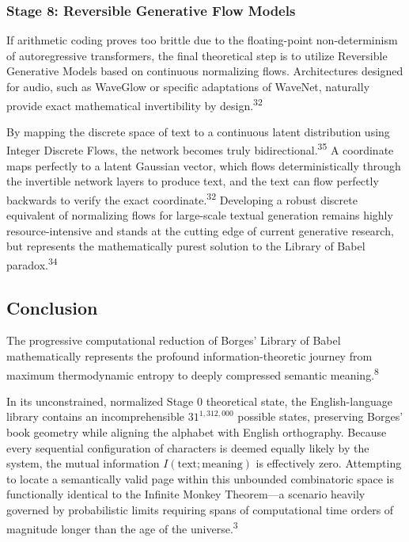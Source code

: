 \documentclass[
  11pt,
  a4paper,
]{article}
\begin{document}
\subsubsection{Stage 8: Reversible Generative Flow Models}\label{stage-8-reversible-generative-flow-models}

If arithmetic coding proves too brittle due to the floating-point non-determinism of autoregressive transformers, the final theoretical step is to utilize Reversible Generative Models based on continuous normalizing flows. Architectures designed for audio, such as WaveGlow or specific adaptations of WaveNet, naturally provide exact mathematical invertibility by design.\textsuperscript{32}

By mapping the discrete space of text to a continuous latent distribution using Integer Discrete Flows, the network becomes truly bidirectional.\textsuperscript{35} A coordinate maps perfectly to a latent Gaussian vector, which flows deterministically through the invertible network layers to produce text, and the text can flow perfectly backwards to verify the exact coordinate.\textsuperscript{32} Developing a robust discrete equivalent of normalizing flows for large-scale textual generation remains highly resource-intensive and stands at the cutting edge of current generative research, but represents the mathematically purest solution to the Library of Babel paradox.\textsuperscript{34}

\subsection{Conclusion}\label{conclusion}

The progressive computational reduction of Borges' Library of Babel mathematically represents the profound information-theoretic journey from maximum thermodynamic entropy to deeply compressed semantic meaning.\textsuperscript{8}

In its unconstrained, normalized Stage 0 theoretical state, the English-language library contains an incomprehensible \(31^{1,312,000}\) possible states, preserving Borges' book geometry while aligning the alphabet with English orthography. Because every sequential configuration of characters is deemed equally likely by the system, the mutual information \(I(\text{text};\text{meaning})\) is effectively zero. Attempting to locate a semantically valid page within this unbounded combinatoric space is functionally identical to the Infinite Monkey Theorem---a scenario heavily governed by probabilistic limits requiring spans of computational time orders of magnitude longer than the age of the universe.\textsuperscript{3}
\end{document}
